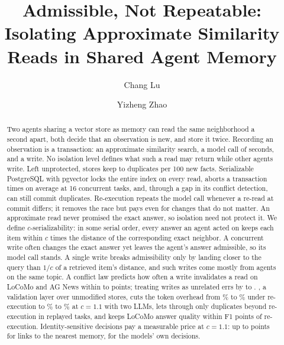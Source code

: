 \documentclass[sigconf, nonacm, review]{acmart}
\begin{document}
\title{Admissible, Not Repeatable: Isolating Approximate Similarity Reads in Shared Agent Memory}

\author{Chang Lu}

\author{Yizheng Zhao}

\begin{abstract}
Two agents sharing a vector store as memory can read the same
neighborhood a second apart, both decide that an observation is new,
and store it twice. Recording an observation is a transaction: an
approximate similarity search, a model call of seconds, and a
write. No isolation level defines what such a read may return while
other agents write. Left unprotected,  stores keep
 to  duplicates per 100 new facts.
Serializable PostgreSQL with pgvector locks the entire index on every
read, aborts a transaction  times on average at 16
concurrent tasks, and, through a gap in its conflict detection, can
still commit duplicates. Re-execution repeats the model call whenever a re-read at commit
differs; it removes the race but pays even for changes that do not matter.
An approximate read never promised the exact answer, so isolation need
not protect it. We define \mbox{$c$-serializability}: in some serial order,
every answer an agent acted on keeps each item within $c$ times the
distance of the corresponding exact neighbor. A concurrent write
often changes the exact answer yet leaves the agent's answer
admissible, so its model call stands. A single write breaks admissibility only by landing closer
to the query than $1/c$ of a retrieved item's distance, and such writes come
mostly from agents on the same topic. A conflict law predicts
how often a write invalidates a read on LoCoMo and AG News within
 to  points; treating
writes as unrelated errs by  to .
\sys{}, a validation layer over unmodified stores, cuts the token
overhead from \% to
\% under re-execution to
\% to \% at $c=1.1$ with
two LLMs, lets through only  duplicates beyond re-execution in
 replayed tasks, and keeps LoCoMo answer quality within
 F1 points of re-execution.
Identity-sensitive decisions pay a measurable price at $c=1.1$: up to
 points for links to the nearest memory,
 for the models' own decisions.
\end{abstract}
\end{document}
